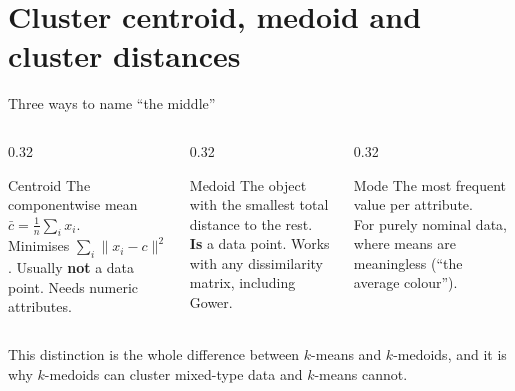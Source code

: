 \documentclass[aspectratio=169]{beamer}
\begin{document}
\section[Centroids]{Cluster centroid, medoid and cluster distances}
\label{sec:cent}

\begin{frame}{Three ways to name ``the middle''}
  \begin{columns}[T]
    \begin{column}{0.32\textwidth}
      \begin{block}{Centroid}
        The componentwise mean $\bar{c} = \tfrac1n \sum_i x_i$.\\[0.3em]
        \small Minimises $\sum_i \|x_i - c\|^2$. Usually \textbf{not} a data
        point. Needs numeric attributes.
      \end{block}
    \end{column}
    \begin{column}{0.32\textwidth}
      \begin{block}{Medoid}
        The object with the smallest total distance to the rest.\\[0.3em]
        \small \textbf{Is} a data point. Works with any dissimilarity
        matrix, including Gower.
      \end{block}
    \end{column}
    \begin{column}{0.32\textwidth}
      \begin{block}{Mode}
        The most frequent value per attribute.\\[0.3em]
        \small For purely nominal data, where means are meaningless
        (``the average colour'').
      \end{block}
    \end{column}
  \end{columns}
  \vspace{0.4em}
  \begin{exampleblock}{}
    \centering
    This distinction is the whole difference between $k$-means and
    $k$-medoids, and it is why $k$-medoids can cluster mixed-type data and
    $k$-means cannot.
  \end{exampleblock}
\end{frame}
\end{document}
